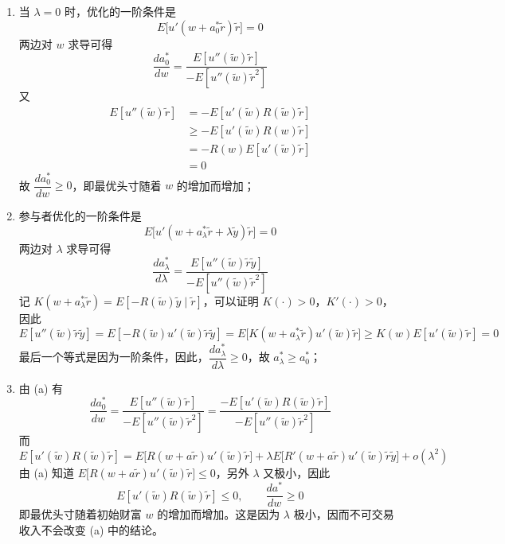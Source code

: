 \begin{solution}
\begin{enumerate}[label=(\alph*)]
    \item 当 $\lambda=0$ 时，优化的一阶条件是
    \[
        E\bigl[u'(w+a_{0}^{*}\tilde{r})\tilde{r}\bigr]=0
    \]
    两边对 $w$ 求导可得
    \[
        \frac{da_{0}^{*}}{dw}=\frac{E[u''(\tilde{w})\tilde{r}]}{-E[u''(\tilde{w})\tilde{r}^{2}]}
    \]
    又
    \[
        \begin{aligned}
            E[u''(\tilde{w})\tilde{r}]
            &=-E[u'(\tilde{w})R(\tilde{w})\tilde{r}]\\
            &\ge -E[u'(\tilde{w})R(w)\tilde{r}]\\
            &=-R(w)E[u'(\tilde{w})\tilde{r}]\\
            &=0
        \end{aligned}
    \]
    故 $\dfrac{da_{0}^{*}}{dw}\ge 0$，即最优头寸随着 $w$ 的增加而增加；

    \item 参与者优化的一阶条件是
    \[
        E\bigl[u'(w+a_{\lambda}^{*}\tilde{r}+\lambda\tilde{y})\tilde{r}\bigr]=0
    \]
    两边对 $\lambda$ 求导可得
    \[
        \frac{da_{\lambda}^{*}}{d\lambda}=\frac{E[u''(\tilde{w})\tilde{r}\tilde{y}]}{-E[u''(\tilde{w})\tilde{r}^{2}]}
    \]
    记 $K(w+a_{\lambda}^{*}\tilde{r})=E[-R(\tilde{w})\tilde{y}\mid\tilde{r}]$，可以证明 $K(\cdot)>0$，$K'(\cdot)>0$，因此
    \[
        E[u''(\tilde{w})\tilde{r}\tilde{y}]=E[-R(\tilde{w})u'(\tilde{w})\tilde{r}\tilde{y}]=E\bigl[K(w+a_{\lambda}^{*}\tilde{r})u'(\tilde{w})\tilde{r}\bigr]\ge K(w)E[u'(\tilde{w})\tilde{r}]=0
    \]
    最后一个等式是因为一阶条件，因此，$\dfrac{da_{\lambda}^{*}}{d\lambda}\ge 0$，故 $a_{\lambda}^{*}\ge a_{0}^{*}$；

    \item 由 (a) 有
    \[
        \frac{da_{0}^{*}}{dw}=\frac{E[u''(\tilde{w})\tilde{r}]}{-E[u''(\tilde{w})\tilde{r}^{2}]}=\frac{-E[u'(\tilde{w})R(\tilde{w})\tilde{r}]}{-E[u''(\tilde{w})\tilde{r}^{2}]}
    \]
    而
    \[
        E[u'(\tilde{w})R(\tilde{w})\tilde{r}]=E\bigl[R(w+a\tilde{r})u'(\tilde{w})\tilde{r}\bigr]+\lambda E\bigl[R'(w+a\tilde{r})u'(\tilde{w})\tilde{r}\tilde{y}\bigr]+o(\lambda^{2})
    \]
    由 (a) 知道 $E\bigl[R(w+a\tilde{r})u'(\tilde{w})\tilde{r}\bigr]\le 0$，另外 $\lambda$ 又极小，因此
    \[
        E[u'(\tilde{w})R(\tilde{w})\tilde{r}]\le 0,\qquad \frac{da^{*}}{dw}\ge 0
    \]
    即最优头寸随着初始财富 $w$ 的增加而增加。这是因为 $\lambda$ 极小，因而不可交易收入不会改变 (a) 中的结论。
\end{enumerate}
\end{solution}

